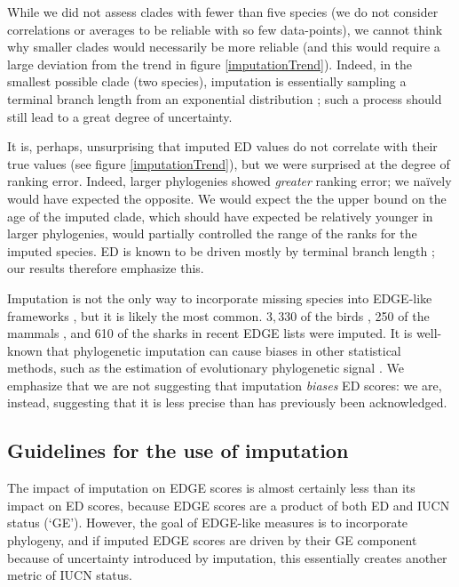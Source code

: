 \documentclass[10pt,english]{article}
\begin{document}
While we did not assess clades with fewer than five species (we do not consider
correlations or averages to be reliable with so few data-points), we cannot
think why smaller clades would necessarily be more reliable (and this would
require a large deviation from the trend in figure \ref{imputationTrend}).
Indeed, in the smallest possible clade (two species), imputation is essentially
sampling a terminal branch length from an exponential distribution
\autocite{Kuhn2011}; such a process should still lead to a great degree of
uncertainty. 

It is, perhaps, unsurprising that imputed ED values do not correlate with their
true values (see figure \ref{imputationTrend}), but we were surprised at the
degree of ranking error. Indeed, larger phylogenies showed \emph{greater}
ranking error; we na\"{i}vely would have expected the opposite. We would expect
the the upper bound on the age of the imputed clade, which should have expected
be relatively younger in larger phylogenies, would partially controlled the
range of the ranks for the imputed species. ED is known to be driven mostly by
terminal branch length \autocite{Isaac2007, Steel2007, Redding2008}; our results
therefore emphasize this.

Imputation is not the only way to incorporate missing species into EDGE-like
frameworks \autocite[see][]{Collen2011,Gumbs2018}, but it is likely the most
common. $3,330$ of the birds \autocite[\textasciitilde30\%;][]{Jetz2014}, 250 of
the mammals \autocite[\textasciitilde 5.6\%;][]{Collen2011}, and 610 of the
sharks \autocite[\textasciitilde49\%;][]{Stein2018} in recent EDGE lists were
imputed. It is well-known that phylogenetic imputation can cause biases in other
statistical methods, such as the estimation of evolutionary phylogenetic signal
\autocite{Rabosky2015}. We emphasize that we are not suggesting that imputation
\emph{biases} ED scores: we are, instead, suggesting that it is less precise
than has previously been acknowledged.

\subsection*{Guidelines for the use of imputation}
The impact of imputation on EDGE scores is almost certainly less than its impact
on ED scores, because EDGE scores are a product of both ED and IUCN status
(‘GE'). However, the goal of EDGE-like measures is to incorporate phylogeny, and
if imputed EDGE scores are driven by their GE component because of uncertainty
introduced by imputation, this essentially creates another metric of IUCN
status. 
\end{document}
